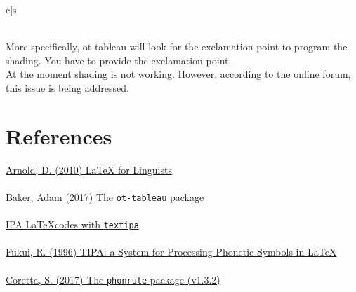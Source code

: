 \documentclass{article}
\begin{document}
\begin{center}
    \begin{tableau}{c|s}
  
 \vio{*!} \vio{}
 \vio{} \vio{*}
\end{tableau}
\end{center}
\\
\HandRight More specifically, ot-tableau will look for the exclamation point to program the shading. You have to provide the exclamation point.\\
\HandRight At the moment shading is not working. However, according to the online forum, this issue is being addressed. \\


\section{References}

\href{https://www1.essex.ac.uk/linguistics/external/clmt/latex4ling/}{Arnold, D. (2010) LaTeX for Linguists} 
\\
\\
\href{https://ctan.math.illinois.edu/macros/latex/contrib/ot-tableau/ot-tableau.pdf}{Baker, Adam (2017) The \texttt{ot-tableau} package}
\\
\\
\href{https://jon.dehdari.org/tutorials/tipachart_mod.pdf}{IPA \LaTeX\space codes with \texttt{textipa}}
\\
\\
\href{http://languagelog.ldc.upenn.edu/myl/ldc/tipaman.pdf}{Fukui, R. (1996) TIPA: a System for Processing Phonetic Symbols in \LaTeX}
\\
\\
\href{https://ctan.math.illinois.edu/macros/latex/contrib/phonrule/phonrule-doc.pdf}{Coretta, S. (2017) The \texttt{phonrule} package (v1.3.2)}
\end{document}
